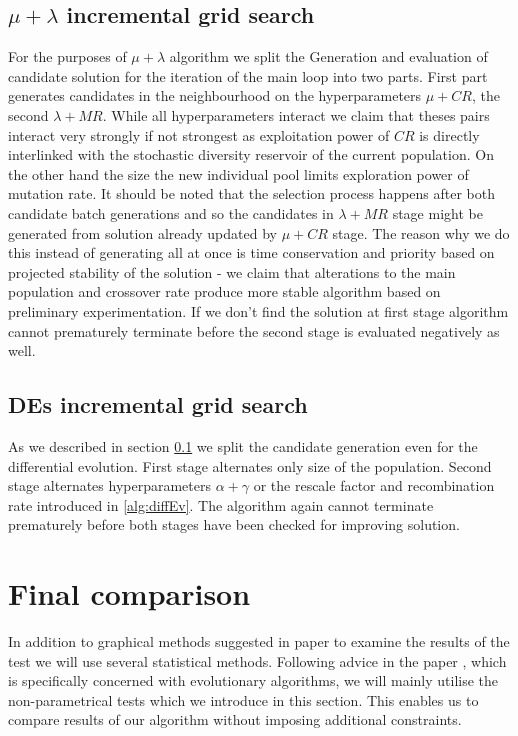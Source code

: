 \subsection{$\mu + \lambda$ incremental grid search}
\label{sec:lambdaGrid}
For the purposes of $\mu + \lambda$ algorithm we split the Generation and evaluation of candidate solution for the iteration of the main loop into two parts.
First part generates candidates in the neighbourhood on the hyperparameters $ \mu  +  CR $, the second $ \lambda +  MR$.
While all hyperparameters interact we claim that theses pairs interact very strongly if not strongest as exploitation power of $ CR $ is directly interlinked with the stochastic diversity reservoir of the current population. On the other hand the size the new individual pool limits exploration power of mutation rate. It should be noted that the selection process happens after both candidate batch generations and so the candidates in $ \lambda +  MR$ stage might be generated from solution already updated by $ \mu  +  CR $ stage. The reason why we do this instead of generating all at once is time conservation and priority based on projected stability of the solution - we claim that alterations to the main population and crossover rate produce more stable algorithm based on preliminary experimentation. If we don't find the solution at first stage algorithm cannot prematurely terminate before the second stage is evaluated negatively as well.

\subsection{DEs incremental grid search}
\label{sec:deGrid}
As we described in section \ref{sec:lambdaGrid} we split the candidate generation even for the differential evolution. First stage alternates only size of the population. Second stage alternates hyperparameters $ \alpha + \gamma $ or the rescale factor and recombination rate introduced in \ref{alg:diffEv}. The algorithm again cannot terminate prematurely before both stages have been checked for improving solution.

\section{Final comparison}
\label{sec:prefinalComp}
In addition to graphical methods suggested in paper  \cite{Beiranvand_2017}
to examine the results of the test we will use several statistical methods. Following advice in the paper \cite{algTesting}, which is specifically concerned with evolutionary algorithms, we will mainly utilise the non-parametrical tests which we introduce in this section. This enables us to compare results of our algorithm without imposing additional constraints. 

